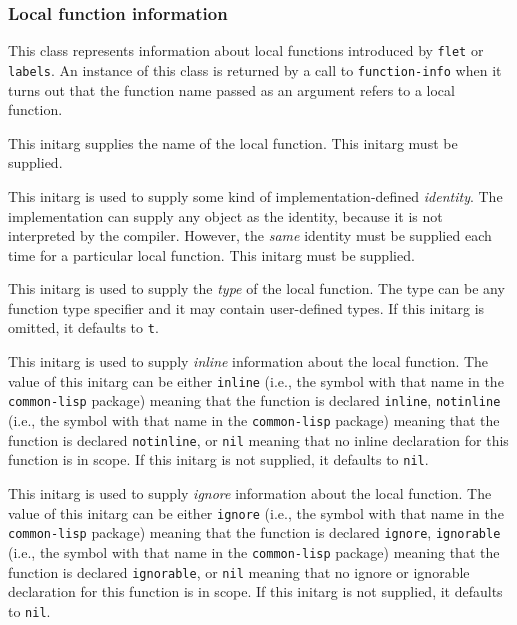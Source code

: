 \subsubsection{Local function information}


This class represents information about local functions introduced by
\texttt{flet} or \texttt{labels}.  An instance of this class is
returned by a call to \texttt{function-info} when it turns out that
the function name passed as an argument refers to a local function. 


This initarg supplies the name of the local function.  This initarg
must be supplied.


This initarg is used to supply some kind of implementation-defined 
\emph{identity}.  The implementation can supply any object as the
identity, because it is not interpreted by the compiler.  However, the
\emph{same} identity must be supplied each time for a particular
local function.  This initarg must be supplied. 


This initarg is used to supply the \emph{type} of the local function.
The type can be any function type specifier and it may contain
user-defined types.  If this initarg is omitted, it defaults to
\texttt{t}.


This initarg is used to supply \emph{inline} information about the
local function.  The value of this initarg can be either
\texttt{inline} (i.e., the symbol with that name in the
\texttt{common-lisp} package) meaning that the function is declared
\texttt{inline}, \texttt{notinline} (i.e., the symbol with that name
in the \texttt{common-lisp} package) meaning that the function is
declared \texttt{notinline}, or \texttt{nil} meaning that no inline
declaration for this function is in scope.  If this initarg is not
supplied, it defaults to \texttt{nil}.


This initarg is used to supply \emph{ignore} information about the
local function.  The value of this initarg can be either
\texttt{ignore} (i.e., the symbol with that name in the
\texttt{common-lisp} package) meaning that the function is declared
\texttt{ignore}, \texttt{ignorable} (i.e., the symbol with that name
in the \texttt{common-lisp} package) meaning that the function is
declared \texttt{ignorable}, or \texttt{nil} meaning that no ignore or
ignorable declaration for this function is in scope.  If this initarg
is not supplied, it defaults to \texttt{nil}.

